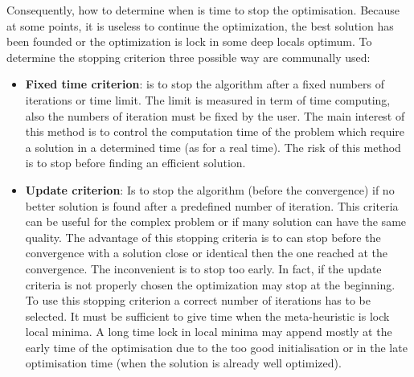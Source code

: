 Consequently, how to determine when is time to stop the optimisation. Because at some points, it is useless to continue the optimization, the best solution has been founded or the optimization is lock in some deep locals optimum.%
 To determine the stopping criterion three possible way are communally used:\\
\begin{itemize}
\item  \textbf{Fixed time criterion}: is to stop the algorithm after a fixed numbers of iterations or time limit. The limit is measured in term of time computing, also the numbers of iteration must be fixed by the user. The main interest of this method is to control the computation time of the problem which require a solution in a determined time (as for a real time). The risk of this method is to stop before finding an efficient solution. \\

\item \textbf{Update criterion}: Is to stop the algorithm (before the convergence) if no better solution is found after a predefined number of iteration. This criteria can be useful for the complex problem or if many solution can have the same quality. 
The advantage of this stopping criteria is to can stop before the convergence with a solution close or identical then the one reached at the convergence. 
The inconvenient is to stop too early. In fact, if the update criteria is not properly chosen the optimization  may stop at the beginning.   \\
To use this stopping criterion a correct number of iterations has to  be selected. 
It must be sufficient to give time when the meta-heuristic is lock local minima. 
A long time lock in local minima may append mostly at the early time of the optimisation due to the too good initialisation or in the late optimisation time (when the solution is already well optimized).\\


\end{itemize}
